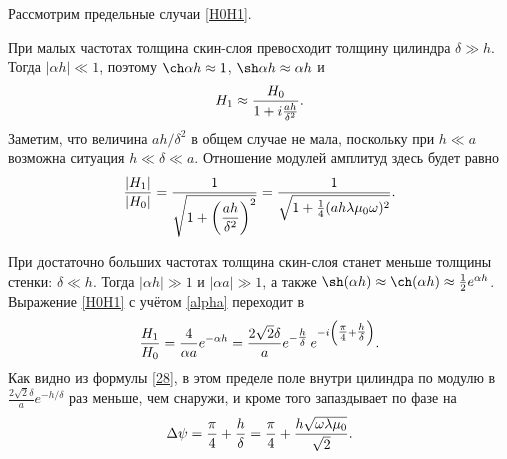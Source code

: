 
Рассмотрим предельные случаи \eqref{H0H1}.

При малых частотах толщина скин-слоя превосходит толщину цилиндра 
$\delta \gg h$. Тогда $|\alpha h| \ll 1$, 
поэтому $\ch \alpha h \approx 1$, $\sh \alpha h\approx \alpha h$ и
\begin{equation}\eqmark{H1}
H_1 \approx \frac{H_0}{1 + i \frac{a h}{\delta ^2}}.
\end{equation}
Заметим, что величина $ah/\delta^2$ в общем случае не мала, поскольку 
при $h\ll a$ возможна ситуация $h\ll \delta \ll a$.
Отношение модулей амплитуд здесь будет равно
\begin{equation} \eqmark{27}
\frac{|H_1|}{|H_0|} = \frac{1}{\sqrt{1+\left(\dfrac{ah}{\delta^2}\right)^2}} = 
\frac{1}{\sqrt{1+\frac14 (ah \lambda \mu_0 \omega)^2}}.
\end{equation}

При достаточно больших частотах толщина скин-слоя станет меньше толщины стенки:
$\delta \ll h$. Тогда $|\alpha h| \gg 1$ и $|\alpha a| \gg 1$, а
также $\sh(\alpha h)\approx\ch(\alpha h)\approx\frac12e^{\alpha h}$. 
Выражение \eqref{H0H1} с учётом \eqref{alpha} переходит в
\begin{equation} \eqmark{28}
\frac{H_1}{H_0}= \frac{4}{\alpha a} e^{-\alpha h} 
= \frac{2\sqrt{2}\delta}{a}e^{-\tfrac{h}{\delta}}\,e^{-i\left(\tfrac{\pi}{4}+\tfrac{h}{\delta}\right)}.
\end{equation}
Как видно из формулы \eqref{28}, в этом пределе поле внутри цилиндра по модулю в
$\frac{2\sqrt{2}\delta}{a}e^{-h/\delta}$ раз меньше, чем снаружи, и 
кроме того запаздывает по фазе на
\begin{equation} \eqmark{29}
\Delta\psi=\frac{\pi}{4}+\frac{h}{\delta}=
\frac{\pi}{4}+\frac{h\sqrt{\omega\lambda\mu_0}}{\sqrt{2}}.
\end{equation}

